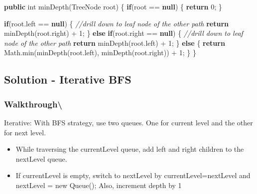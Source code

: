 \documentclass[]{book}
\newenvironment{Shaded}{\begin{snugshade}}{\end{snugshade}}
\newcommand{\BuiltInTok}[1]{#1}
\newcommand{\CommentTok}[1]{\textcolor[rgb]{0.56,0.35,0.01}{\textit{#1}}}
\newcommand{\DataTypeTok}[1]{\textcolor[rgb]{0.13,0.29,0.53}{#1}}
\newcommand{\DecValTok}[1]{\textcolor[rgb]{0.00,0.00,0.81}{#1}}
\newcommand{\FunctionTok}[1]{\textcolor[rgb]{0.00,0.00,0.00}{#1}}
\newcommand{\KeywordTok}[1]{\textcolor[rgb]{0.13,0.29,0.53}{\textbf{#1}}}
\newcommand{\NormalTok}[1]{#1}
\providecommand{\tightlist}{%
  \setlength{\itemsep}{0pt}\setlength{\parskip}{0pt}}
\begin{document}
\begin{Shaded}
\begin{Highlighting}[]
\KeywordTok{public} \DataTypeTok{int} \FunctionTok{minDepth}\NormalTok{(}\BuiltInTok{TreeNode}\NormalTok{ root) \{}
    \KeywordTok{if}\NormalTok{(root == }\KeywordTok{null}\NormalTok{) \{}
        \KeywordTok{return} \DecValTok{0}\NormalTok{;}
\NormalTok{    \}}

    \KeywordTok{if}\NormalTok{(root.}\FunctionTok{left}\NormalTok{ == }\KeywordTok{null}\NormalTok{) \{}
        \CommentTok{//drill down to leaf node of the other path}
        \KeywordTok{return} \FunctionTok{minDepth}\NormalTok{(root.}\FunctionTok{right}\NormalTok{) + }\DecValTok{1}\NormalTok{;}
\NormalTok{    \} }\KeywordTok{else} \KeywordTok{if}\NormalTok{(root.}\FunctionTok{right}\NormalTok{ == }\KeywordTok{null}\NormalTok{) \{}
        \CommentTok{//drill down to leaf node of the other path}
        \KeywordTok{return} \FunctionTok{minDepth}\NormalTok{(root.}\FunctionTok{left}\NormalTok{) + }\DecValTok{1}\NormalTok{;}
\NormalTok{    \} }\KeywordTok{else}\NormalTok{ \{}
        \KeywordTok{return} \BuiltInTok{Math}\NormalTok{.}\FunctionTok{min}\NormalTok{(}\FunctionTok{minDepth}\NormalTok{(root.}\FunctionTok{left}\NormalTok{), }\FunctionTok{minDepth}\NormalTok{(root.}\FunctionTok{right}\NormalTok{)) + }\DecValTok{1}\NormalTok{;}
\NormalTok{    \}}
\NormalTok{\}}
\end{Highlighting}
\end{Shaded}

\hypertarget{solution---iterative-bfs}{%
\subsection{Solution - Iterative BFS}\label{solution---iterative-bfs}}

\hypertarget{walkthrough-76}{%
\subsubsection{Walkthrough\textbackslash{}}\label{walkthrough-76}}

Iterative: With BFS strategy, use two queues. One for current level and the other for next level.

\begin{itemize}
\tightlist
\item
  While traversing the currentLevel queue, add left and right children to the nextLevel queue.
\item
  If currentLevel is empty, switch to nextLevel by currentLevel=nextLevel and nextLevel = new Queue();
  Also, increment depth by 1
\end{itemize}
\end{document}
